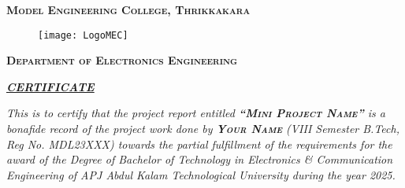 \thispagestyle{empty}
\begin{doublespace}

\begin{center}
	\textsc{\textbf{\Large{Model Engineering College, Thrikkakara}}}
\end{center}

\begin{figure}[H]
	\begin{center}
		\leavevmode
			\texttt{[image: LogoMEC]}
	\end{center}
\end{figure}

\vspace{0.1cm}

\begin{center}
	\textsc{\textbf{\Large{Department of Electronics Engineering}}}
\end{center}

\vspace{0.05cm}

\begin{center}
\textbf{\textit{\Large{\underline{CERTIFICATE}}}}
\end{center}


	\textit{This is to certify that the project report entitled \textsc{\textbf{\enquote{Mini Project Name}}} is a bonafide record of the project work done by \textsc{\textbf{Your Name}} (VIII Semester B.Tech, Reg No. MDL23XXX) towards the partial fulfillment of the requirements for the award of the Degree of Bachelor of Technology in Electronics \& Communication Engineering of APJ Abdul Kalam Technological University during the year 2025.}
	
\end{doublespace}	

